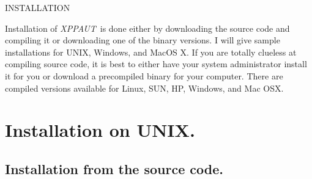 \documentclass{article}
\newcommand{\XPP}{{\sl XPPAUT\, }}
\begin{document}
  
\begin{center}
{\Large INSTALLATION}
\end{center}

Installation of \XPP is done either by
downloading the source code and compiling it or downloading one of the
binary versions. I will give sample installations for UNIX, 
Windows, and MacOS X. 
 If you are totally clueless at compiling source code, it is best to
either have your system administrator install it for you or download a
precompiled binary for your computer. There are compiled versions
available for Linux, SUN, HP, Windows, and Mac OSX.
\section{Installation on UNIX.}
\subsection{Installation from the source code.}
\end{document}
